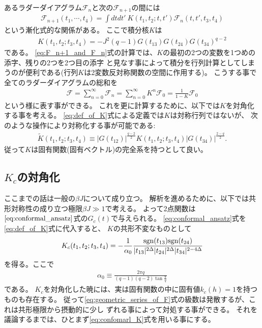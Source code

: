 あるラダーダイアグラム$\mathcal{F}_n$と次の$\mathcal{F}_{n+1}$の間には
\begin{align}
	\mathcal{F}_{n+1}(t_1, \cdots, t_4)
	= \int dtdt'\ K(t_1, t_2; t, t')\mathcal{F}_n(t, t', t_3, t_4)
	\label{eq:F_n+1_and_F_n}
\end{align}
という漸化式的な関係がある。
ここで積分核$K$は
\begin{align}
	K(t_1, t_2; t_3, t_4) = -J^2(q-1)G(t_{13})G(t_{24})G(t_{34})^{q-2}
	\label{eq:def_of_K}
\end{align}
である。
\eqref{eq:F_n+1_and_F_n}式の計算では、$K$の最初の2つの変数を1つめの添字、残りの2つを2つ目の添字
と見なす事によって積分を行列計算としてしまうのが便利である(行列$K$は2変数反対称関数の空間に作用する)。
こうする事で全てのラダーダイアグラムの総和を
\begin{align}
	\mathcal{F}
	= \sum_{n=0}^{\infty}\mathcal{F}_n
	= \sum_{n=0}^{\infty}K^n \mathcal{F}_0
	= \frac{1}{1 - K}\mathcal{F}_0
	\label{eq:geometric_series_of_F}
\end{align}
という様に表す事ができる。
これを更に計算するために、以下では$K$を対角化する事を考える。
\eqref{eq:def_of_K}式による定義では$K$は対称行列ではないが、
次のような操作により対称化する事が可能である:
\begin{align}
	\tilde{K}(t_1, t_2; t_3, t_4) \equiv
	|G(t_{12})|^{\frac{q-2}{2}}K(t_1, t_2; t_3, t_4)|G(t_{34})|^{\frac{2-q}{2}}.
\end{align}
従って$K$は固有関数(固有ベクトル)の完全系を持つとして良い。

\subsection{$K_c$の対角化}
ここまでの話は一般の$\beta J$について成り立つ。
解析を進めるために、以下では共形対称性の成り立つ極限$\beta J \gg 1$で考える。
よって2点関数は$\eqref{eq:conformal_ansatz}$式の$G_c(t)$で与えられる。
\eqref{eq:conformal_ansatz}式を\eqref{eq:def_of_K}式に代入すると、
$K$の共形不変なものとして
\begin{align}
	K_c(t_1, t_2; t_3, t_4)
	= -\frac{1}{\alpha_0}
		\frac{\mathrm{sgn}(t_{13})\mathrm{sgn}(t_{24})}{|t_{13}|^{2\Delta}|t_{24}|^{2\Delta}|t_{34}|^{2-4\Delta}}
	\label{eq:confomarl_K}
\end{align}
を得る。ここで
\begin{align}
	\alpha_0 \equiv \frac{2\pi q}{(q-1)(q-2)\tan\frac{\pi}{q}}
\end{align}
である。
$K_c$を対角化した暁には、実は固有関数の中に固有値$k_c(h) = 1$を持つものも存在する。
従って\eqref{eq:geometric_series_of_F}式の級数は発散するが、これは共形極限から摂動的に少し
ずれる事によって対処する事ができる。
それを議論するまでは、ひとまず\eqref{eq:confomarl_K}式を用いる事にする。

